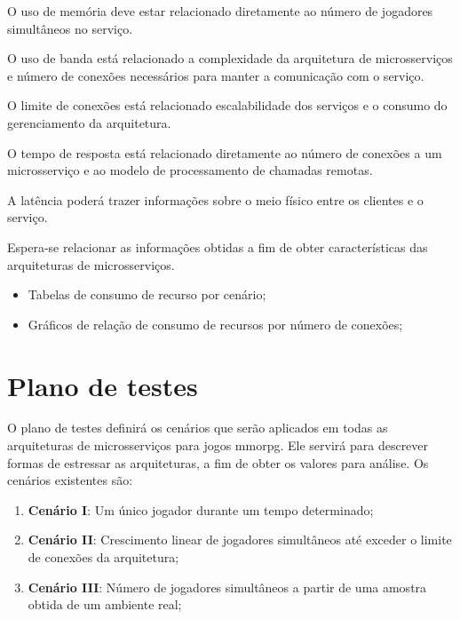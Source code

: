 O uso de memória deve estar relacionado diretamente ao número de jogadores simultâneos no serviço.

O uso de banda está relacionado a complexidade da arquitetura de microsserviços e número de conexões necessários para manter a comunicação com o serviço.

O limite de conexões está relacionado escalabilidade dos serviços e o consumo do gerenciamento da arquitetura.

O tempo de resposta está relacionado diretamente ao número de conexões a um microsserviço e ao modelo de processamento de chamadas remotas.

A latência poderá trazer informações sobre o meio físico entre os clientes e o serviço.

Espera-se relacionar as informações obtidas a fim de obter características das arquiteturas de microsserviços.

\begin{itemize}
  \item Tabelas de consumo de recurso por cenário;
  \item Gráficos de relação de consumo de recursos por número de conexões;
\end{itemize}






\section {Plano de testes}
\label{sec:plano}

O plano de testes definirá os cenários que serão aplicados em todas as arquiteturas de microsserviços para jogos \ac{mmorpg}.
%
Ele servirá para descrever formas de estressar as arquiteturas, a fim de obter os valores para análise.
%
Os cenários existentes são:

\begin{enumerate}
  \item \textbf{Cenário I}: Um único jogador durante um tempo determinado;
  \item \textbf{Cenário II}: Crescimento linear de jogadores simultâneos até exceder o limite de conexões da arquitetura;
  \item \textbf{Cenário III}: Número de jogadores simultâneos a partir de uma amostra obtida de um ambiente real;
\end{enumerate}


% 
